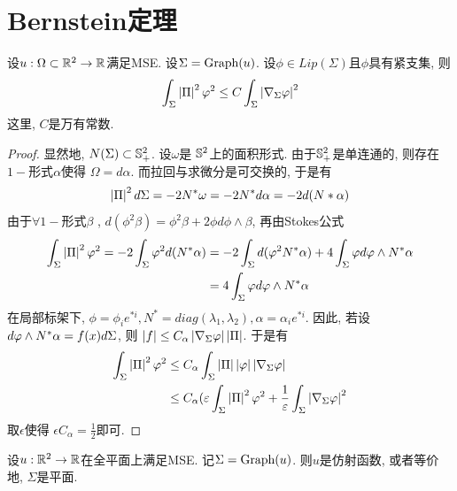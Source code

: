 \section{Bernstein定理}
\begin{proposition} \label{caccio}
    设$u: \Omega \subset \R^2 \to \R$满足MSE. 设$\Sigma=\G(u)$. 设$\phi \in Lip(\Sigma)$且$\phi$具有紧支集, 则
    \begin{equation}
        \int_{\Sigma}\abs{\II}^2\phi^2 \le C\int_\Sigma \abs{\nabla_{\Sigma}\phi}^2
    \end{equation}
    这里,  $C$是万有常数.
\end{proposition}
\begin{proof}
    显然地, $\N(\Sigma) \subset \S^2_+$. 设$\omega$是 $\S^2$上的面积形式. 由于$\S^2_+$是单连通的, 则存在$1-$形式$\alpha$使得  $\Omega=d\alpha$. 而拉回与求微分是可交换的, 于是有 
    \begin{equation}
        \abs{\II}^2d\Sigma=-2\N^*\omega=-2\N^*d\alpha=-2d(\N*\alpha)
    \end{equation}
    由于$\forall 1-$形式$\beta$ , $d(\phi^2\beta)=\phi^2\beta+2\phi d\phi\wedge\beta$, 再由Stokes公式
    \begin{equation}
        \begin{split}
            \int_\Sigma \abs{\II}^2\phi^2 = -2 \int_\Sigma \phi^2 d(\N^*\alpha) &=-2\int_\Sigma d(\phi^2\N^*\alpha)+4\int_\Sigma \phi d\phi\wedge N^*\alpha\\
            &= 4\int_\Sigma  \phi d\phi\wedge N^*\alpha
        \end{split}
    \end{equation}
    在局部标架下, $\phi=\phi_i e^{*i}, N^*=diag(\lambda_1,\lambda_2), \alpha=\alpha_i e^{*i}$. 因此, 若设 $d\phi\wedge \N^*\alpha= f(x)d\Sigma$, 则 $\abs{f} \le C_\alpha \abs{\nabla_\Sigma \phi}\abs{\II}$. 于是有
    \begin{equation}
        \begin{split}
            \int_\Sigma \abs{\II}^2\phi^2 &\le C_\alpha \int_\Sigma \abs{\II}\abs{\phi} \abs{\nabla_\Sigma \phi} \\
            & \le C_\alpha(\epsilon \int_\Sigma \abs{\II}^2\phi^2 + \frac{1}{\epsilon}\int_\Sigma  \abs{\nabla_\Sigma \phi}^2 \\
        \end{split}
    \end{equation}
    取$\epsilon$使得 $\epsilon C_\alpha=\frac{1}{2}$即可.
\end{proof}
\begin{theorem}
    设$u: \R^2 \to \R$在全平面上满足MSE.  记$\Sigma=\G(u)$. 则$u$是仿射函数, 或者等价地, $\Sigma$是平面.
\end{theorem}
